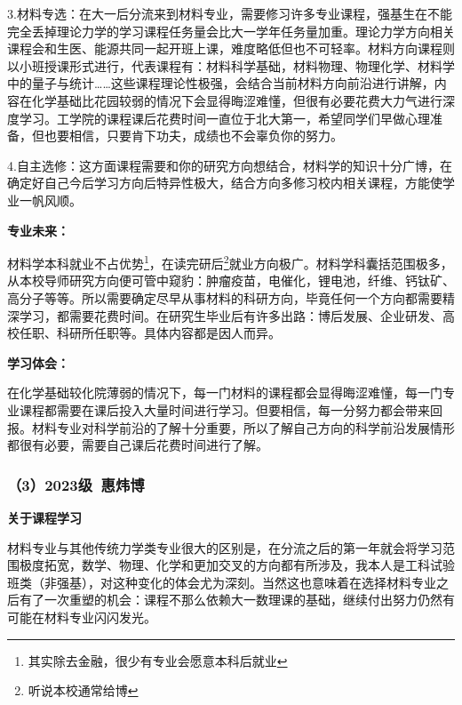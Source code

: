 \documentclass[11pt,oneside]{book}
\begin{document}
3.材料专选：在大一后分流来到材料专业，需要修习许多专业课程，强基生在不能完全丢掉理论力学的学习课程任务量会比大一学年任务量加重。理论力学方向相关课程会和生医、能源共同一起开班上课，难度略低但也不可轻率。材料方向课程则以小班授课形式进行，代表课程有：材料科学基础，材料物理、物理化学、材料学中的量子与统计……这些课程理论性极强，会结合当前材料方向前沿进行讲解，内容在化学基础比花园较弱的情况下会显得晦涩难懂，但很有必要花费大力气进行深度学习。工学院的课程课后花费时间一直位于北大第一，希望同学们早做心理准备，但也要相信，只要肯下功夫，成绩也不会辜负你的努力。

\vspace{10pt}

4.自主选修：这方面课程需要和你的研究方向想结合，材料学的知识十分广博，在确定好自己今后学习方向后特异性极大，结合方向多修习校内相关课程，方能使学业一帆风顺。

\vspace{10pt}

\textbf{专业未来：}

材料学本科就业不占优势\footnote{其实除去金融，很少有专业会愿意本科后就业}，在读完研后\footnote{听说本校通常给博}就业方向极广。材料学科囊括范围极多，从本校导师研究方向便可管中窥豹：肿瘤疫苗，电催化，锂电池，纤维、钙钛矿、高分子等等。所以需要确定尽早从事材料的科研方向，毕竟任何一个方向都需要精深学习，都需要花费时间。在研究生毕业后有许多出路：博后发展、企业研发、高校任职、科研所任职等。具体内容都是因人而异。

\vspace{10pt}

\textbf{学习体会：}

在化学基础较化院薄弱的情况下，每一门材料的课程都会显得晦涩难懂，每一门专业课程都需要在课后投入大量时间进行学习。但要相信，每一分努力都会带来回报。材料专业对科学前沿的了解十分重要，所以了解自己方向的科学前沿发展情形都很有必要，需要自己课后花费时间进行了解。

\subsubsection{（3）2023级\ 惠炜博}

\textbf{关于课程学习}

材料专业与其他传统力学类专业很大的区别是，在分流之后的第一年就会将学习范围极度拓宽，数学、物理、化学和更加交叉的方向都有所涉及，我本人是工科试验班类（非强基），对这种变化的体会尤为深刻。当然这也意味着在选择材料专业之后有了一次重塑的机会：课程不那么依赖大一数理课的基础，继续付出努力仍然有可能在材料专业闪闪发光。
\end{document}
